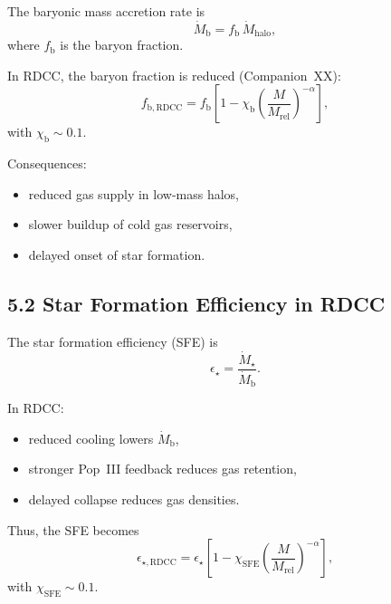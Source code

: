 \documentclass[11pt,a4paper]{article}
\begin{document}
The baryonic mass accretion rate is
\begin{equation}
    \dot{M}_{\mathrm{b}}
    = f_{\mathrm{b}}\, \dot{M}_{\mathrm{halo}},
\end{equation}
where $f_{\mathrm{b}}$ is the baryon fraction.

In RDCC, the baryon fraction is reduced (Companion~XX):
\begin{equation}
    f_{\mathrm{b,RDCC}}
    = f_{\mathrm{b}}
      \left[
        1 - \chi_{\mathrm{b}}
        \left(\frac{M}{M_{\mathrm{rel}}}\right)^{-\alpha}
      \right],
\end{equation}
with $\chi_{\mathrm{b}} \sim 0.1$.

Consequences:

\begin{itemize}
    \item reduced gas supply in low-mass halos,
    \item slower buildup of cold gas reservoirs,
    \item delayed onset of star formation.
\end{itemize}

\subsection*{5.2 Star Formation Efficiency in RDCC}

The star formation efficiency (SFE) is
\begin{equation}
    \epsilon_{\star}
    = \frac{\dot{M}_{\star}}{\dot{M}_{\mathrm{b}}}.
\end{equation}

In RDCC:

\begin{itemize}
    \item reduced cooling lowers $\dot{M}_{\mathrm{b}}$,
    \item stronger Pop~III feedback reduces gas retention,
    \item delayed collapse reduces gas densities.
\end{itemize}

Thus, the SFE becomes
\begin{equation}
    \epsilon_{\star,\mathrm{RDCC}}
    = \epsilon_{\star}
      \left[
        1 - \chi_{\mathrm{SFE}}
        \left(\frac{M}{M_{\mathrm{rel}}}\right)^{-\alpha}
      \right],
\end{equation}
with $\chi_{\mathrm{SFE}} \sim 0.1$.
\end{document}
